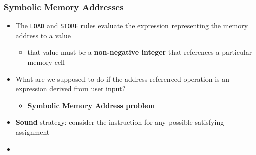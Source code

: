 \begin{frame}
	\frametitle{Symbolic Memory Addresses}
	\begin{itemize}
		\item The \texttt{LOAD} and \texttt{STORE} rules evaluate the expression representing the memory address to a value
		\begin{itemize}
			\item  that value must be a \textbf{non-negative integer} that references a particular memory cell
		\end{itemize}
		\item What are we supposed to do if the address referenced operation is an expression derived from user input?
		\begin{itemize}
			\item \textbf{Symbolic Memory Address problem}
		\end{itemize}
		\item \textbf{Sound} strategy: consider the instruction for any possible satisfying assignment 
		\item<2-> 
	\end{itemize}
\end{frame}